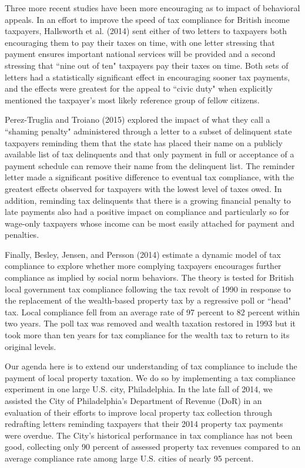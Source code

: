 \documentclass[12pt,titlepage]{article}
\begin{document}
Three more recent studies have been more encouraging as to impact of
behavioral appeals. In an effort to improve the speed of tax
compliance for British income taxpayers, Hallsworth et al. (2014)
sent either of two letters to taxpayers both encouraging them to pay
their taxes on time, with one letter stressing that payment ensures
important national services will be provided and a second stressing
that ``nine out of ten" taxpayers pay their taxes on time.  Both sets
of letters had a statistically significant effect in encouraging
sooner tax payments, and the effects were greatest for the appeal to
``civic duty" when explicitly mentioned the taxpayer's most likely
reference group of fellow citizens.

Perez-Truglia and Troiano (2015) explored the impact of what they call
a ``shaming penalty" administered through a letter to a subset of
delinquent state taxpayers reminding them that the state has placed
their name on a publicly available list of tax delinquents and that
only payment in full or acceptance of a payment schedule can remove
their name from the delinquent list.  The reminder letter made a
significant positive difference to eventual tax compliance, with the
greatest effects observed for taxpayers with the lowest level of taxes
owed.  In addition, reminding tax delinquents that there is a growing
financial penalty to late payments also had a positive impact on
compliance and particularly so for wage-only taxpayers whose income
can be most easily attached for payment and penalties.

Finally, Besley, Jensen, and Persson (2014) estimate a dynamic model
of tax compliance to explore whether more complying taxpayers
encourages further compliance as implied by social norm behaviors.
The theory is tested for British local government tax compliance
following the tax revolt of 1990 in response to the replacement of the
wealth-based property tax by a regressive poll or ``head" tax.  Local
compliance fell from an average rate of 97 percent to 82 percent
within two years.  The poll tax was removed and wealth taxation
restored in 1993 but it took more than ten years for tax compliance
for the wealth tax to return to its original levels.

Our agenda here is to extend our understanding of tax compliance to
include the payment of local property taxation.  We do so by
implementing a tax compliance experiment in one large U.S. city,
Philadelphia.  In the late fall of 2014, we assisted the City of
Philadelphia's Department of Revenue (DoR) in an evaluation
of their efforts to improve local property tax collection through
redrafting letters reminding taxpayers that their 2014 property tax
payments were overdue.  The City's historical performance in tax
compliance has not been good, collecting only 90 percent of assessed
property tax revenues compared to an average compliance rate among
large U.S. cities of nearly 95 percent.
\end{document}
